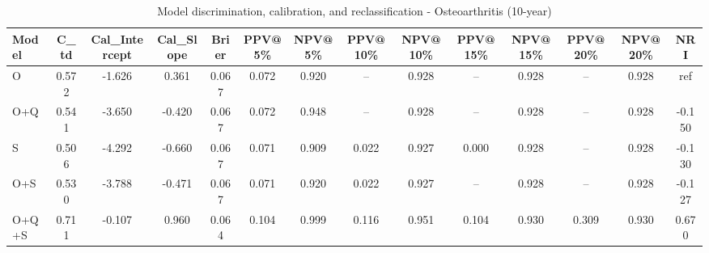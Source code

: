 \begin{table}[htbp]
\centering
\small
\caption{Model discrimination, calibration, and reclassification - Osteoarthritis (10-year)}
\label{tab:perf_osteoarthritis_10y}
\begin{tabular}{lccccccccccccc}
\toprule
Model & C\_td & Cal\_Intercept & Cal\_Slope & Brier & PPV@5\% & NPV@5\% & PPV@10\% & NPV@10\% & PPV@15\% & NPV@15\% & PPV@20\% & NPV@20\% & NRI \\
\midrule
O & 0.572 & -1.626 & 0.361 & 0.067 & 0.072 & 0.920 & -- & 0.928 & -- & 0.928 & -- & 0.928 & ref \\
O+Q & 0.541 & -3.650 & -0.420 & 0.067 & 0.072 & 0.948 & -- & 0.928 & -- & 0.928 & -- & 0.928 & -0.150 \\
S & 0.506 & -4.292 & -0.660 & 0.067 & 0.071 & 0.909 & 0.022 & 0.927 & 0.000 & 0.928 & -- & 0.928 & -0.130 \\
O+S & 0.530 & -3.788 & -0.471 & 0.067 & 0.071 & 0.920 & 0.022 & 0.927 & -- & 0.928 & -- & 0.928 & -0.127 \\
O+Q+S & 0.711 & -0.107 & 0.960 & 0.064 & 0.104 & 0.999 & 0.116 & 0.951 & 0.104 & 0.930 & 0.309 & 0.930 & 0.670 \\
\bottomrule
\end{tabular}
\end{table}
